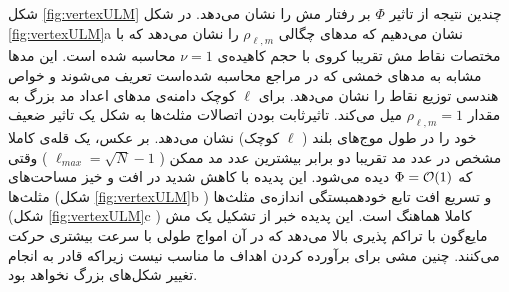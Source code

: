 شکل
\ref{fig:vertexULM}
چندین نتیجه از تاثیر 
 $\Phi$
بر رفتار مش را نشان می‌دهد. در شکل 
\ref{fig:vertexULM}a
نشان می‌دهیم که مد‌های چگالی
$\rho_{\ell,m}$
را نشان می‌دهد که با مختصات نقاط مش تقریبا کروی با حجم کاهیده‌ی 
$\nu=1$
محاسبه‌ شده است. این مد‌ها مشابه به مد‌های خمشی که در مراجع 
\cite{safran1983, milnersafranPRA1987}
محاسبه شده‌است تعریف می‌شوند و خواص هندسی توزیع نقاط را نشان می‌دهد. برای 
$\ell$
کوچک دامنه‌ی مد‌های اعداد مد بزرگ به مقدار
$\rho_{\ell,m}=1$
میل می‌کند. تاثیرثابت بودن اتصالات مثلث‌ها به شکل یک تاثیر ضعیف خود را در طول‌ موج‌های بلند (
$\ell$
کوچک) نشان می‌دهد. بر عکس، یک قله‌ی کاملا مشخص در عدد مد تقریبا دو برابر بیشترین عدد مد ممکن (
$\ell_{max}=\sqrt{N}-1$
) وقتی که 
$\Phi = {\cal O}(1)$
دیده می‌شود. این پدیده با کاهش شدید در افت و خیز مساحت‌های مثلث‌ها  (شکل
\ref{fig:vertexULM}b
) و تسریع افت تابع خودهمبستگی اندازه‌ی مثلث‌ها (شکل
\ref{fig:vertexULM}c
) کاملا هماهنگ است. این پدیده خبر از تشکیل یک مش مایع‌گون با تراکم پذیری بالا می‌دهد که در آن امواج طولی با سرعت بیشتری حرکت می‌کنند. چنین مشی برای برآورده کردن اهداف ما مناسب نیست زیراکه قادر به انجام تغییر شکل‌های بزرگ نخواهد بود.













